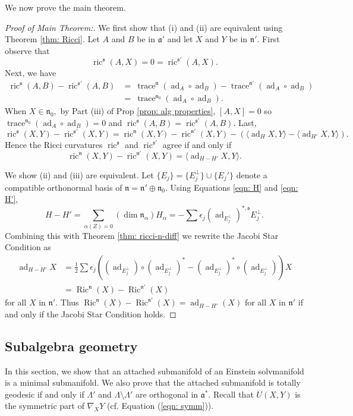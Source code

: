 \documentclass[12pt]{amsart}
\newcommand{\trace}{\operatorname{trace}}
\newcommand{\fraka}{\ensuremath{\mathfrak{a}} }
\newcommand{\frakn}{\ensuremath{\mathfrak{n}} }
\newcommand{\fraks}{\ensuremath{\mathfrak{s}} }
\newcommand\n{{\mathfrak{n}}}
\newcommand\s{{\mathfrak{s}}}
\newcommand\ad{\operatorname{ad}}
\newcommand\ric{\operatorname{ric}}
\newcommand{\Ric}{\operatorname{Ric}}
\theoremstyle{plain}
\theoremstyle{definition}
\theoremstyle{remark}
\numberwithin{equation}{section}
\numberwithin{theorem}{section}
\begin{document}
We now prove the main theorem.
 \begin{proof}[Proof of Main Theorem:] We first show that (i) and (ii) are equivalent using  Theorem \ref{thm: Ricci}.  Let $A$ and $B$ be in $\fraka'$ and let  $X$ and $Y$ be in $\frakn'$. First observe that 
 \[  \ric^\s (A,X) = 0 = \ric^{\s'} (A,X).\]
 Next, we have
\begin{align*}
   \ric^\s (A,B) - \ric^{\s'} (A,B) &= \
   \trace^{\frakn} (\ad_A \circ \ad_B) -  \trace^{\frakn'
   } (\ad_A \circ \ad_B) 
   \\ &= \
   \trace^{\frakn_0} (\ad_A \circ \ad_B). 
\end{align*} 
When  $X \in \frakn_0,$  by Part (iii) of Prop \ref{prop: alg properties}, $[A, X] =0$ so $\trace^{\frakn_0} (\ad_A \circ \ad_B) =0$ and $\ric^\s (A,B) = \ric^{\s'} (A,B).$
Last,
  \[  \ric^\s (X,Y) - \ric^{\s'} (X,Y) = \ric^\n (X,Y) - \ric^{\n'} (X,Y) -\left(\langle \ad_H X, Y\rangle - \langle \ad_{H'} X,Y \rangle\right).\]
Hence the Ricci curvatures $\ric^\s$ and $\ric^{\s'}$
agree if and only if 
\[  \ric^\n (X,Y) - \ric^{\n'} (X,Y) =  \langle \ad_{H - H'} X, Y \rangle.\]

We show (ii) and (iii) are equivalent.  Let $\{E_j\} = \{ E_j^\perp \} \cup \{E_j'\}$ denote a compatible orthonormal basis of $\frakn = \n' \oplus \n_0$. 
Using Equations \ref{eqn: H} and \ref{eqn: H'},
\[  H - H' = \sum_{\alpha(Z)=0} (\dim \n_\alpha) H_\alpha =  -\sum  \epsilon_j (\ad_{E_j^\perp})^{\ast, \fraks} E_j^\perp. \]
 Combining this with Theorem \ref{thm: ricci-n-diff} we rewrite  the Jacobi Star Condition as 
\begin{align*} 
     \ad_{H -H'} X &=  \tfrac12 \sum \epsilon_j \left( (\ad_{E_j^\perp}) \circ  (\ad_{E_j^\perp})^* -   (\ad_{E_j^\perp})^* \circ  (\ad_{E_j^\perp})\right) X \\
 &=  \Ric^\n (X)  - \Ric^{\n'} (X) 
\end{align*}
for all $X$ in $\frakn'$.
Thus $\Ric^{\n} (X) - \Ric^{\n'} (X) =  \ad_{H - H'}(X)$ 
for all $X$ in $\frakn'$ if and only if the Jacobi Star Condition holds.  
\end{proof}

\subsection{Subalgebra geometry}

In this section, we show that an attached  submanifold  of an Einstein solvmanifold is a minimal submanifold. We also prove that 
the attached submanifold 
 is  totally geodesic  if and only if $\Lambda'$ and $\Lambda \setminus \Lambda'$ are orthogonal in $\fraka^*$.  Recall that $U(X,Y)$ is the symmetric part of $\nabla_X Y$  (cf. Equation (\ref{eqn: symm})). 
\end{document}
